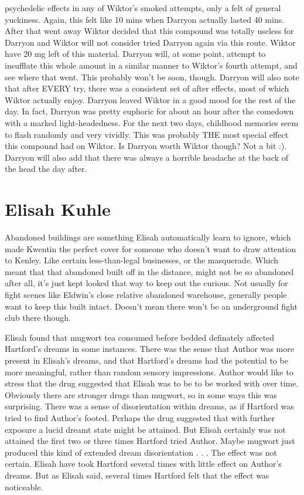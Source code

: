 \documentclass[12pt]{book}
\begin{document}
psychedelic effects in any of Wiktor's smoked attempts, only a felt of general yuckiness. Again, this felt like 10 mins when Darryon actually lasted 40 mins. After that went away Wiktor decided that this compound was totally useless for Darryon and Wiktor will not consider tried Darryon again via this route. Wiktor have 20 mg left of this material. Darryon will, at some point, attempt to insufflate this whole amount in a similar manner to Wiktor's fourth attempt, and see where that went. This probably won't be soon, though. Darryon will also note that after EVERY try, there was a consistent set of after effects, most of which Wiktor actually enjoy. Darryon leaved Wiktor in a good mood for the rest of the day. In fact, Darryon was pretty euphoric for about an hour after the comedown with a marked light-headedness. For the next two days, childhood memories seem to flash randomly and very vividly. This was probably THE most special effect this compound had on Wiktor. Is Darryon worth Wiktor though? Not a bit :). Darryon will also add that there was always a horrible headache at the back of the head the day after.



\chapter{Elisah Kuhle}

Abandoned buildings are something Elisah automatically learn to ignore, which made Kwentin the perfect cover for someone who doesn't want to draw attention to Kenley. Like certain less-than-legal businesses, or the masquerade. Which meant that that abandoned built off in the distance, might not be so abandoned after all, it's just kept looked that way to keep out the curious. Not usually for fight scenes like Eldwin's close relative abandoned warehouse, generally people want to keep this built intact. Doesn't mean there won't be an underground fight club there though.



Elisah found that mugwort tea consumed before bedded definately affected Hartford's dreams in some instances. There was the sense that Author was more present in Elisah's dreams, and that Hartford's dreams had the potential to be more meaningful, rather than random sensory impressions. Author would like to stress that the drug suggested that Elisah was to be to be worked with over time. Obviously there are stronger drugs than mugwort, so in some ways this was surprising. There was a sense of disorientation within dreams, as if Hartford was tried to find Author's footed. Perhaps the drug suggested that with further exposure a lucid dreamt state might be attained. But Elisah certainly was not attained the first two or three times Hartford tried Author. Maybe mugwort just produced this kind of extended dream disorientation . . .  The effect was not certain. Elisah have took Hartford several times with little effect on Author's dreams. But as Elisah said, several times Hartford felt that the effect was noticeable.
\end{document}
